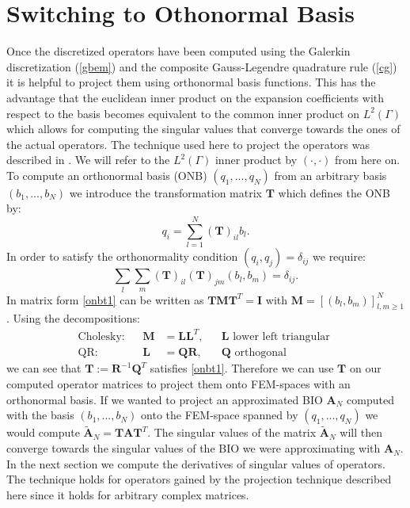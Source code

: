 \documentclass[a4paper, oneside]{discothesis}
\begin{document}
\section{Switching to Othonormal Basis} \label{sec:po}
Once the discretized operators have been computed using the Galerkin discretization (\ref{gbem}) and the composite Gauss-Legendre quadrature rule (\ref{cg}) it is helpful to project them using orthonormal basis functions. 
This has the advantage that the euclidean inner product on the expansion coefficients with respect to the basis becomes equivalent to the common inner product on $L^2(\Gamma)$ which allows for computing the singular values that converge towards the ones of the actual operators.
The technique used here to project the operators was described in \cite{LAN16}.
We will refer to the $L^2(\Gamma)$ inner product by $(\cdot,\cdot)$ from here on.
To compute an orthonormal basis (ONB) $(q_1,...,q_N)$ from an arbitrary basis $(b_1,...,b_N)$ we introduce the transformation matrix $\mathbf{T}$ which defines the ONB by:
\begin{equation}
	q_i  = \sum_{l=1}^N (\mathbf{T})_{il}b_l.	
\end{equation}
In order to satisfy the orthonormality condition $(q_i,q_j) = \delta_{ij}$ we require:
\begin{equation}
	\sum_l\sum_m(\mathbf{T})_{il}(\mathbf{T})_{jm}(b_l,b_m) = \delta_{ij}. \label{onbt1}
\end{equation}
In matrix form \ref{onbt1} can be written as $\mathbf{T}\mathbf{M}\mathbf{T}^T=\mathbf{I}$ with $\mathbf{M}=[(b_l,b_m)]_{l,m\geq1}^N$.
Using the decompositions:
\begin{align}
	\text{Cholesky}:& &\mathbf{M} &= \mathbf{LL}^T,& &\mathbf{L} \text{ lower left triangular }\\
	\text{QR}:& &\mathbf{L} &= \mathbf{QR},& &\mathbf{Q}\text{ orthogonal }
\end{align}
we can see that $\mathbf{T}:= \mathbf{R}^{-1}\mathbf{Q}^T$ satisfies \ref{onbt1}.
Therefore we can use $\mathbf{T}$ on our computed operator matrices to project them onto FEM-spaces with an orthonormal basis.
If we wanted to project an approximated BIO $\mathbf{A}_N$ computed with the basis $(b_1,...,b_N)$ onto the FEM-space spanned by $(q_1,...,q_N)$ we would compute $\mathbf{\tilde{A}}_N=\mathbf{TAT}^T$.
The singular values of the matrix $\mathbf{\tilde{A}}_N$ will then converge towards the singular values of the BIO we were approximating with $\mathbf{A}_N$.
In the next section we compute the derivatives of singular values of operators.
The technique holds for operators gained by the projection technique described here since it holds for arbitrary complex matrices.
\end{document}
